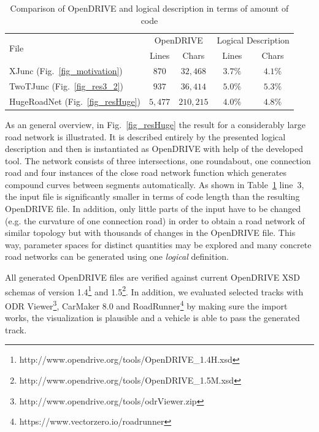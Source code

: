\documentclass[a4paper, 10pt, conference]{ieeeconf}      %
\begin{document}
\begin{table}[h]
	\caption{Comparison of OpenDRIVE and logical description in terms of amount of code}
	\label{tab_comparison}
	\def\arraystretch{1.5}
	\begin{center}
		\begin{tabular}{l|cccc}
			\multirow{2}{*}{File} & \multicolumn{2}{c}{OpenDRIVE} & \multicolumn{2}{c}{Logical Description}\\
			& Lines & Chars & Lines & Chars \\
			\hline
			XJunc (Fig.~\ref{fig_motivation}) & $870$ & $32,468$& $3.7\%$ &$4.1\%$\\
			TwoTJunc (Fig.~\ref{fig_res3_2}) & $937$ & $36,414$& $5.0\%$ &$5.3\%$\\
			HugeRoadNet (Fig.~\ref{fig_resHuge}) & $5,477$ & $210,215$& $4.0\%$ &$4.8\%$
		\end{tabular}
	\end{center}
\end{table}

\addtolength{\textheight}{-10.5cm}   %
As an general overview, in Fig.~\ref{fig_resHuge} the result for a considerably large road network is illustrated. It is described entirely by the presented logical description and then is instantiated as OpenDRIVE with help of the developed tool. The network consists of three intersections, one roundabout, one connection road and four instances of the close road network function which generates compound curves between segments automatically. As shown in Table~\ref{tab_comparison} line~3, the input file is significantly smaller in terms of code length than the resulting OpenDRIVE file. In addition, only little parts of the input have to be changed (e.g. the curvature of one connection road) in order to obtain a road network of similar topology but with thousands of changes in the OpenDRIVE file. This way, parameter spaces for distinct quantities may be explored and many concrete road networks can be generated using one \emph{logical} definition.

All generated OpenDRIVE files are verified against current OpenDRIVE XSD schemas of version 1.4\footnote{http://www.opendrive.org/tools/OpenDRIVE\_1.4H.xsd} and 1.5\footnote{http://www.opendrive.org/tools/OpenDRIVE\_1.5M.xsd}. In addition, we evaluated selected tracks with ODR Viewer\footnote{http://www.opendrive.org/tools/odrViewer.zip}, CarMaker 8.0 and RoadRunner\footnote{https://www.vectorzero.io/roadrunner} by making sure the import works, the visualization is plausible and a vehicle is able to pass the generated track.
\end{document}
